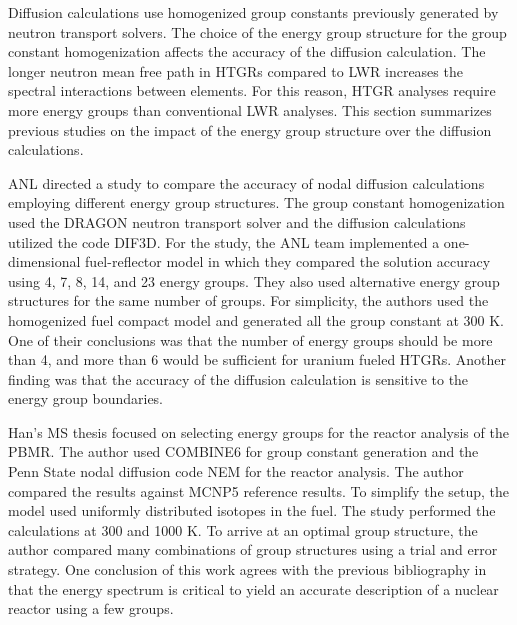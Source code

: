 Diffusion calculations use homogenized group constants previously generated by neutron transport solvers.
The choice of the energy group structure for the group constant homogenization affects the accuracy of the diffusion calculation.
The longer neutron mean free path in \glspl{HTGR} compared to \gls{LWR} increases the spectral interactions between elements.
For this reason, HTGR analyses require more energy groups than conventional \gls{LWR} analyses.
This section summarizes previous studies on the impact of the energy group structure over the diffusion calculations.

\gls{ANL} directed a study \cite{lee_status_2006} to compare the accuracy of nodal diffusion calculations employing different energy group structures.
The group constant homogenization used the DRAGON neutron transport solver and the diffusion calculations utilized the code DIF3D.
For the study, the ANL team implemented a one-dimensional fuel-reflector model in which they compared the solution accuracy using 4, 7, 8, 14, and 23 energy groups.
They also used alternative energy group structures for the same number of groups.
For simplicity, the authors used the homogenized fuel compact model and generated all the group constant at 300 K.
One of their conclusions was that the number of energy groups should be more than 4, and more than 6 would be sufficient for uranium fueled HTGRs.
Another finding was that the accuracy of the diffusion calculation is sensitive to the energy group boundaries.


Han's MS thesis \cite{han_sensitivity_2008} focused on selecting energy groups for the reactor analysis of the \gls{PBMR}.
The author used COMBINE6 \cite{grimesey_combinepc-portable_1994} for group constant generation and the Penn State nodal diffusion code NEM \cite{bandini_three-dimensional_1990} for the reactor analysis.
The author compared the results against MCNP5 reference results.
To simplify the setup, the model used uniformly distributed isotopes in the fuel.
The study performed the calculations at 300 and 1000 K.
To arrive at an optimal group structure, the author compared many combinations of group structures using a trial and error strategy.
One conclusion of this work agrees with the previous bibliography \cite{gulf_oil_company_nuclear_1973} \cite{duderstadt_nuclear_1976} in that the energy spectrum is critical to yield an accurate description of a nuclear reactor using a few groups.

